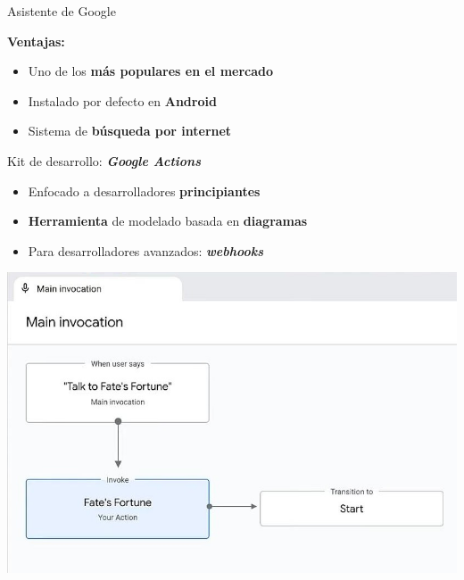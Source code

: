 \documentclass{beamer}
\begin{document}
  \begin{frame}[label=asistente-google]{ Asistente de Google}
    {
      \textbf{Ventajas:}
      \vspace{1.5em}
      \begin{itemize}
        \setlength\itemsep{1.5em}
        \item Uno de los \textbf{más populares en el mercado}
        \item Instalado por defecto en \textbf{Android}
        \item Sistema de \textbf{búsqueda por internet}
      \end{itemize}
    }
    {
      Kit de desarrollo: \textbf{\emph{Google Actions}}
      \begin{itemize}
        \item Enfocado a desarrolladores \textbf{principiantes}
        \item \textbf{Herramienta} de modelado basada en \textbf{diagramas}
        \item Para desarrolladores avanzados: \textbf{\textit{webhooks}}
      \end{itemize}
      \includegraphics[scale=.4]{google-actions-console.jpg}
    }
  \end{frame}
\end{document}
